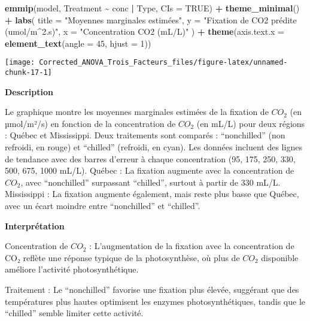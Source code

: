 \documentclass[
]{article}
\newenvironment{Shaded}{\begin{snugshade}}{\end{snugshade}}
\newcommand{\AttributeTok}[1]{\textcolor[rgb]{0.13,0.29,0.53}{#1}}
\newcommand{\ConstantTok}[1]{\textcolor[rgb]{0.56,0.35,0.01}{#1}}
\newcommand{\DecValTok}[1]{\textcolor[rgb]{0.00,0.00,0.81}{#1}}
\newcommand{\FunctionTok}[1]{\textcolor[rgb]{0.13,0.29,0.53}{\textbf{#1}}}
\newcommand{\NormalTok}[1]{#1}
\newcommand{\SpecialCharTok}[1]{\textcolor[rgb]{0.81,0.36,0.00}{\textbf{#1}}}
\newcommand{\StringTok}[1]{\textcolor[rgb]{0.31,0.60,0.02}{#1}}
\begin{document}
\begin{Shaded}
\begin{Highlighting}[]
\FunctionTok{emmip}\NormalTok{(model, Treatment }\SpecialCharTok{\textasciitilde{}}\NormalTok{ conc }\SpecialCharTok{|}\NormalTok{ Type, }\AttributeTok{CIs =} \ConstantTok{TRUE}\NormalTok{) }\SpecialCharTok{+}
  \FunctionTok{theme\_minimal}\NormalTok{() }\SpecialCharTok{+}
  \FunctionTok{labs}\NormalTok{(}
    \AttributeTok{title =} \StringTok{"Moyennes marginales estimées"}\NormalTok{, }
    \AttributeTok{y =} \StringTok{"Fixation de CO2 prédite (umol/m\^{}2.s)"}\NormalTok{,  }
    \AttributeTok{x =} \StringTok{"Concentration CO2 (mL/L)"}
\NormalTok{  ) }\SpecialCharTok{+}
  \FunctionTok{theme}\NormalTok{(}\AttributeTok{axis.text.x =} \FunctionTok{element\_text}\NormalTok{(}\AttributeTok{angle =} \DecValTok{45}\NormalTok{, }\AttributeTok{hjust =} \DecValTok{1}\NormalTok{))}
\end{Highlighting}
\end{Shaded}

\begin{center}\texttt{[image: Corrected\_ANOVA\_Trois\_Facteurs\_files/figure-latex/unnamed-chunk-17-1]} \end{center}

\textbf{Description}

Le graphique montre les moyennes marginales estimées de la fixation de
\(CO_2\) (en µmol/m²/s) en fonction de la concentration de \(CO_2\) (en
mL/L) pour deux régions : Québec et Mississippi. Deux traitements sont
comparés : ``nonchilled'' (non refroidi, en rouge) et ``chilled''
(refroidi, en cyan). Les données incluent des lignes de tendance avec
des barres d'erreur à chaque concentration (95, 175, 250, 330, 500, 675,
1000 mL/L). Québec : La fixation augmente avec la concentration de
\(CO_2\), avec ``nonchilled'' surpassant ``chilled'', surtout à partir
de 330 mL/L. Mississippi : La fixation augmente également, mais reste
plus basse que Québec, avec un écart moindre entre ``nonchilled'' et
``chilled''.

\textbf{Interprétation}

Concentration de \(CO_2\) : L'augmentation de la fixation avec la
concentration de CO₂ reflète une réponse typique de la photosynthèse, où
plus de \(CO_2\) disponible améliore l'activité photosynthétique.

Traitement : Le ``nonchilled'' favorise une fixation plus élevée,
suggérant que des températures plus hautes optimisent les enzymes
photosynthétiques, tandis que le ``chilled'' semble limiter cette
activité.
\end{document}
